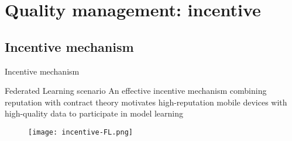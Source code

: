 \section{Quality management: incentive}

\subsection{Incentive mechanism}

\begin{frame}{Incentive mechanism}
  \begin{exampleblock}{Federated Learning scenario}
 An effective incentive mechanism \alert{combining reputation with contract theory} motivates high-reputation mobile devices with high-quality data to participate in model learning
  \end{exampleblock}
  \begin{figure}[h]
        \centering
        \texttt{[image: incentive-FL.png]}
      \end{figure}
\end{frame}

